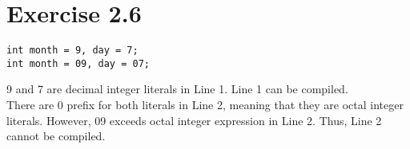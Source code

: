 \documentclass{article}
\begin{document}
\section*{Exercise 2.6}

\begin{lstlisting}
int month = 9, day = 7; 
int month = 09, day = 07;
\end{lstlisting}

\begin{flushleft}
9 and 7 are decimal integer literals in Line 1. Line 1 can be compiled. \\

There are 0 prefix for both literals in Line 2, meaning that they are octal integer literals.
However, 09 exceeds octal integer expression in Line 2. Thus, Line 2 cannot be compiled.
\end{flushleft}
\end{document}
